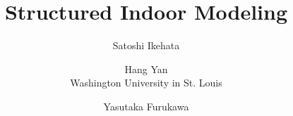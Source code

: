 \documentclass[10pt,twocolumn,letterpaper]{article}
\begin{document}
	
\title{Structured Indoor Modeling}
	
\author{Satoshi Ikehata\\
	\and
	Hang Yan\\
	Washington University in St. Louis\\
	\and
	Yasutaka Furukawa\\
}
	
\maketitle
	
\end{document}
